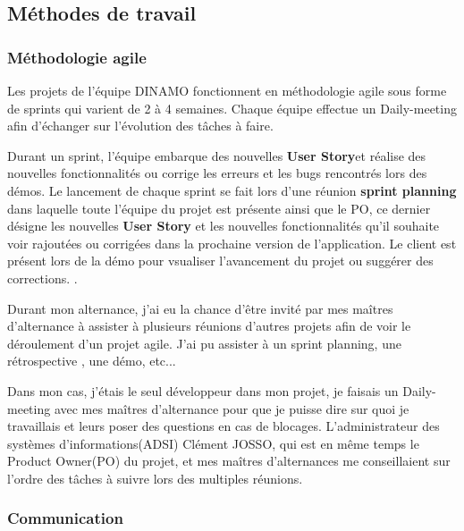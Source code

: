 \documentclass[12pt]{article}
\begin{document}
\subsection{Méthodes de travail}
\subsubsection{Méthodologie agile}

Les projets de l'équipe DINAMO fonctionnent en méthodologie agile sous forme de sprints qui varient de 2 à 4 semaines. Chaque équipe effectue un Daily-meeting afin d'échanger sur l'évolution des tâches à faire.

Durant un sprint, l'équipe embarque des nouvelles \textbf{User Story}\footnotemark et réalise des nouvelles fonctionnalités ou corrige les erreurs et les bugs rencontrés lors des démos. Le lancement de chaque sprint se fait lors d'une réunion \textbf{sprint planning} dans laquelle toute l'équipe du projet est présente ainsi que le PO, ce dernier désigne les nouvelles \textbf{User Story} et les nouvelles fonctionnalités qu'il souhaite voir rajoutées ou corrigées dans la prochaine version de l'application. Le client est présent lors de la démo pour vsualiser l'avancement du projet ou suggérer des corrections. 
.

Durant mon alternance, j'ai eu la chance d'être invité par mes maîtres d'alternance à assister à plusieurs réunions d'autres projets afin de voir le déroulement d'un projet agile. J'ai pu assister à un sprint planning, une rétrospective , une démo, etc...    

Dans mon cas, j'étais le seul développeur dans mon projet, je faisais un Daily-meeting avec mes maîtres d'alternance pour que je puisse dire sur quoi je travaillais et leurs poser des questions en cas de blocages. L'administrateur des systèmes d'informations(ADSI) Clément JOSSO, qui est en même temps le Product Owner(PO) du projet, et mes maîtres d'alternances me conseillaient sur l'ordre des tâches à suivre lors des multiples réunions.   

\subsubsection{Communication}
\end{document}
